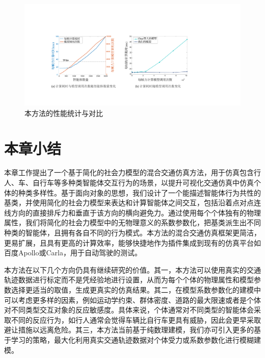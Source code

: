 \begin{figure}[tbh]
\centering
\includegraphics[width=\textwidth]{figure/simplified/simplified_perform_cn_v2.pdf}
\caption[本方法的性能统计与对比]{
本方法的性能统计与对比
}
\label{fig:simplified_performance}
\end{figure}


\section{本章小结}

本章工作提出了一个基于简化的社会力模型的混合交通仿真方法，用于仿真包含行人、车、自行车等多种类智能体交互行为的场景，以提升可视化交通仿真中仿真个体的种类多样性。基于面向对象的思想，我们设计了一个能描述智能体行为共性的基类，并使用简化的社会力模型来表达和计算智能体之间交互，包括沿着点对点连线方向的直接排斥力和垂直于该方向的横向避免力。通过使用每个个体独有的物理属性，我们将简化的社会力模型中的无物理意义的系数参数化，把基类派生出不同种类的智能体，且拥有各自不同的行为模式。本方法的混合交通仿真框架更简洁，更易扩展，且具有更高的计算效率，能够快捷地作为插件集成到现有的仿真平台如百度Apollo或Carla，用于自动驾驶的测试。

本方法在以下几个方向仍具有继续研究的价值。其一，本方法可以使用真实的交通轨迹数据进行标定而不是凭经验地进行设置，从而为每个个体的物理属性和模型参数选择更适当的取值，生成更真实的仿真结果。其二，在模型系数参数化的建模中可以考虑更多样的因素，例如运动学约束、群体密度、道路的最大限速或者是个体对不同类型交互对象的反应敏感度。具体来说，个体通常对不同类型的智能体会采取不同的反应行为，如行人通常会觉得车辆比自行车更具有威胁，因此会更早采取避让措施以远离危险。其三，本方法当前基于纯数理建模，我们亦可引入更多的基于学习的策略，最大化利用真实交通轨迹数据对个体受力或系数参数化进行模糊建模。

